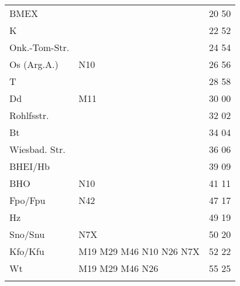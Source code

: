 \begin{tabular}{!{\color{schiefergrau}\vrule width 3pt}*{3}{l!{\color{schiefergrau}\vrule width 3pt}}}
\hline
{}
 \\
\hline
BMEX         &                                                                       & 20 50 \\
K            &                                                                       & 22 52 \\
Onk.-Tom-Str.&                                                                       & 24 54 \\
Os (Arg.A.)  & \nbus{} N10                                                           & 26 56 \\
T            &                                                                       & 28 58 \\
Dd           & \mbus{} M11                                                           & 30 00 \\
Rohlfsstr.   &                                                                       & 32 02 \\
Bt           &                                                                       & 34 04 \\
Wiesbad. Str.&                                                                       & 36 06 \\
BHEI/Hb      &                                                                       & 39 09 \\
BHO          & \nbus{} N10                                                           & 41 11 \\
Fpo/Fpu      & \nusieben{} \nbus{} N42                                               & 47 17 \\
Hz           &                                                                       & 49 19 \\
Sno/Snu      & \nuneun{} \nbus{} N7X                                                 & 50 20 \\
Kfo/Kfu      & \nueins{} \nuzwei{} \nuneun{} \mbus{} M19 M29 M46 \nbus{} N10 N26 N7X & 52 22 \\
Wt           & \nueins{} \nuzwei{} \mbus{} M19 M29 M46 \nbus{} N26                   & 55 25 \\
\myhline
\end{tabular}
